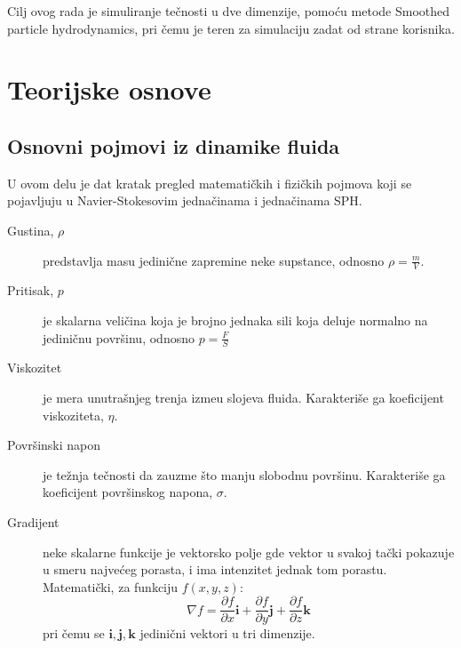\documentclass[12pt]{article}
\renewcommand{\vec}[1]{\mathbf{#1}}
\begin{document}
    Cilj ovog rada je simuliranje te\v cnosti u dve dimenzije, pomo\'cu metode Smoothed particle hydrodynamics, pri \v cemu je teren za simulaciju zadat od strane korisnika.

\section{Teorijske osnove}
    \subsection{Osnovni pojmovi iz dinamike fluida}
        U ovom delu je dat kratak pregled matemati\v ckih i fizi\v ckih pojmova koji se pojavljuju u Navier-Stokesovim jedna\v cinama i jedna\v cinama SPH.
        \label{definicije}
        \begin{description}
          \item[Gustina, $\rho$] predstavlja masu jedini\v cne zapremine neke supstance, odnosno $\rho = \frac{m}{V}$.
          \item[Pritisak, $p$] je skalarna veli\v cina koja je brojno jednaka sili koja deluje normalno na jedini\v cnu povr\v sinu, odnosno $p = \frac{F}{S}$
          \item[Viskozitet] je mera unutra\v snjeg trenja izme\dj u slojeva fluida. Karakteri\v se ga koeficijent viskoziteta, $\eta$.
          \item[Povr\v sinski napon] je te\v znja te\v cnosti da zauzme \v sto manju slobodnu povr\v sinu. Karakteri\v se ga koeficijent povr\v sinskog napona, $\sigma$.
          \item[Gradijent] neke skalarne funkcije je vektorsko polje gde vektor u svakoj ta\v cki pokazuje u smeru najve\'ceg porasta, i ima intenzitet jednak tom porastu. Matemati\v cki, za funkciju $f(x, y, z)$:
                \begin{equation}\label{eq:definicija gradijenta}
                \nabla f=\frac{\partial f}{\partial x}\vec{i} + \frac{\partial f}{\partial y}\vec{j} + \frac{\partial f}{\partial z}\vec{k}
                \end{equation}
                pri \v cemu se $\vec{i}, \vec{j}, \vec{k}$ jedini\v cni vektori u tri dimenzije.

\end{description}
\end{document}
